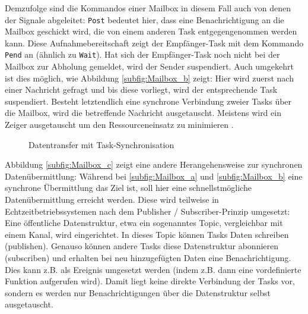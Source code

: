 \documentclass{llncs}
\begin{document}
Demzufolge sind die Kommandos einer Mailbox in diesem Fall auch von denen der Signale abgeleitet: \texttt{Post} bedeutet hier, dass eine Benachrichtigung an die Mailbox geschickt wird, die von einem anderen Task entgegengenommen werden kann. Diese Aufnahmebereitschaft zeigt der Empfänger-Task mit dem Kommando \texttt{Pend} an (ähnlich zu \texttt{Wait}). Hat sich der Empfänger-Task noch nicht bei der Mailbox zur Abholung gemeldet, wird der Sender suspendiert. Auch umgekehrt ist dies möglich, wie Abbildung \ref{subfig:Mailbox_b} zeigt: Hier wird zuerst nach einer Nachricht gefragt und bis diese vorliegt, wird der entsprechende Task suspendiert. Besteht letztendlich eine synchrone Verbindung zweier Tasks über die Mailbox, wird die betreffende Nachricht ausgetauscht. Meistens wird ein Zeiger ausgetauscht um den Ressourceneinsatz zu minimieren \autocite[vgl.][99]{Cooling2017}.
\begin{figure}[h]
	\centering
	\begin{subfigure}{.40\columnwidth} %
		\def\svgwidth{\columnwidth}
		
	\end{subfigure}
	\caption{\label{fig:Mailbox_gesamt}Datentransfer mit Task-Synchronisation \autocite[vgl.][99]{Cooling2017}}
\end{figure}
Abbildung \ref{subfig:Mailbox_c} zeigt eine andere Herangehensweise zur synchronen Datenübermittlung: Während bei \ref{subfig:Mailbox_a} und \ref{subfig:Mailbox_b} eine synchrone Übermittlung das Ziel ist, soll hier eine schnellstmögliche Datenübermittlung erreicht werden. Diese wird teilweise in Echtzeitbetriebssystemen nach dem Publisher / Subscriber-Prinzip umgesetzt: Eine öffentliche Datenstruktur, etwa ein sogenanntes Topic, vergleichbar mit einem Kanal, wird eingerichtet. In dieses Topic können Tasks Daten schreiben (publishen). Genauso können andere Tasks diese Datenstruktur abonnieren (subscriben) und erhalten bei neu hinzugefügten Daten eine Benachrichtigung. Dies kann z.B. als Ereignis umgesetzt werden (indem z.B. dann eine vordefinierte Funktion aufgerufen wird). Damit liegt keine direkte Verbindung der Tasks vor, sondern es werden nur Benachrichtigungen über die Datenstruktur selbst ausgetauscht.\\
\end{document}
